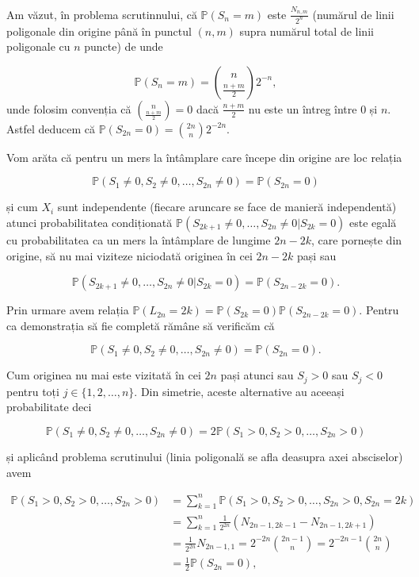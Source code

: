 \documentclass[]{article}
\begin{document}
Am văzut, în problema scrutinnului, că \(\mathbb{P}(S_n=m)\) este
\(\frac{N_{n,m}}{2^n}\) (numărul de linii poligonale din origine până în
punctul \((n,m)\) supra numărul total de linii poligonale cu \(n\)
puncte) de unde

\[
  \mathbb{P}(S_n=m) = \binom{n}{\frac{n+m}{2}}2^{-n},
\] unde folosim convenția că \(\binom{n}{\frac{n+m}{2}} = 0\) dacă
\(\frac{n+m}{2}\) nu este un întreg între \(0\) și \(n\). Astfel deducem
că \(\mathbb{P}(S_{2n} = 0) = \binom{2n}{n}2^{-2n}\).

Vom arăta că pentru un mers la întâmplare care începe din origine are
loc relația

\[
  \mathbb{P}(S_1\neq 0, S_2\neq 0, \ldots, S_{2n}\neq 0) = \mathbb{P}(S_{2n}=0)
\]

și cum \(X_i\) sunt independente (fiecare aruncare se face de manieră
independentă) atunci probabilitatea condiționată
\(\mathbb{P}(S_{2k+1}\neq 0, \ldots, S_{2n}\neq 0|S_{2k} = 0)\) este
egală cu probabilitatea ca un mers la întâmplare de lungime \(2n-2k\),
care pornește din origine, să nu mai viziteze niciodată originea în cei
\(2n-2k\) pași sau

\[
  \mathbb{P}(S_{2k+1}\neq 0, \ldots, S_{2n}\neq 0|S_{2k} = 0) = \mathbb{P}(S_{2n-2k}=0).
\]

Prin urmare avem relația
\(\mathbb{P}(L_{2n} = 2k) = \mathbb{P}(S_{2k}=0)\mathbb{P}(S_{2n-2k}=0)\).
Pentru ca demonstrația să fie completă rămâne să verificăm că

\[
  \mathbb{P}(S_1\neq 0, S_2\neq 0, \ldots, S_{2n}\neq 0) = \mathbb{P}(S_{2n}=0).
\]

Cum originea nu mai este vizitată în cei \(2n\) pași atunci sau
\(S_j>0\) sau \(S_j<0\) pentru toți \(j\in\{1,2,\ldots,n\}\). Din
simetrie, aceste alternative au aceeași probabilitate deci

\[
  \mathbb{P}(S_1\neq 0, S_2\neq 0, \ldots, S_{2n}\neq 0) = 2 \mathbb{P}(S_1> 0, S_2> 0, \ldots, S_{2n}> 0)
\]

și aplicând problema scrutinului (linia poligonală se afla deasupra axei
absciselor) avem

\begin{align*}
  \mathbb{P}(S_1> 0, S_2> 0, \ldots, S_{2n}> 0) &= \sum_{k = 1}^{n}\mathbb{P}(S_1> 0, S_2> 0, \ldots, S_{2n}> 0, S_{2n} = 2k)\\
          &= \sum_{k = 1}^{n}\frac{1}{2^{2n}}(N_{2n-1, 2k-1} - N_{2n-1, 2k+1})\\
          &= \frac{1}{2^{2n}}N_{2n-1, 1} = 2^{-2n}\binom{2n-1}{n} = 2^{-2n-1}\binom{2n}{n} \\
          &= \frac{1}{2}\mathbb{P}(S_{2n}=0),
\end{align*}
\end{document}
